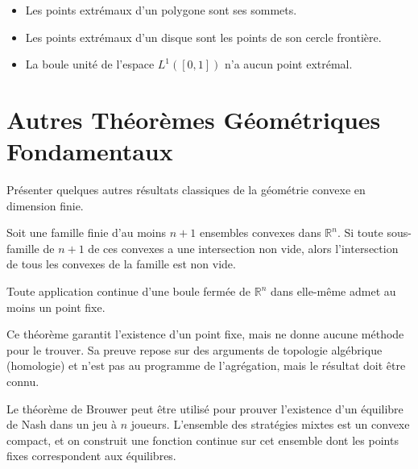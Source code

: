 \begin{example}
    \begin{itemize}
        \item Les points extrémaux d'un polygone sont ses sommets.
        \item Les points extrémaux d'un disque sont les points de son cercle frontière.
        \item La boule unité de l'espace $L^1([0,1])$ n'a aucun point extrémal.
    \end{itemize}
\end{example}

\section{Autres Théorèmes Géométriques Fondamentaux}

\begin{objectif}
    Présenter quelques autres résultats classiques de la géométrie convexe en dimension finie.
\end{objectif}

\begin{theorem}
    Soit une famille finie d'au moins $n+1$ ensembles convexes dans $\mathbb{R}^n$. Si toute sous-famille de $n+1$ de ces convexes a une intersection non vide, alors l'intersection de tous les convexes de la famille est non vide.
\end{theorem}

\begin{theorem}
    Toute application continue d'une boule fermée de $\mathbb{R}^n$ dans elle-même admet au moins un point fixe.
\end{theorem}
\begin{remark}
    Ce théorème garantit l'existence d'un point fixe, mais ne donne aucune méthode pour le trouver. Sa preuve repose sur des arguments de topologie algébrique (homologie) et n'est pas au programme de l'agrégation, mais le résultat doit être connu.
\end{remark}

\begin{application}
    Le théorème de Brouwer peut être utilisé pour prouver l'existence d'un équilibre de Nash dans un jeu à $n$ joueurs. L'ensemble des stratégies mixtes est un convexe compact, et on construit une fonction continue sur cet ensemble dont les points fixes correspondent aux équilibres.
\end{application}